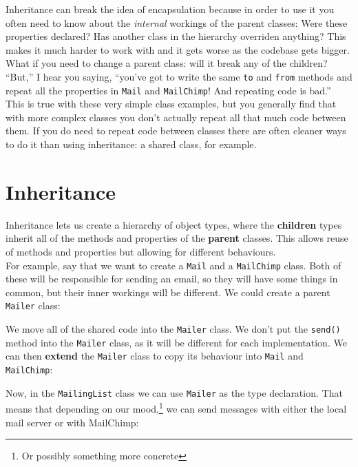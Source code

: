 Inheritance can break the idea of encapsulation because in order to use it you often need to know about the \textit{internal} workings of the parent classes: Were these properties declared? Has another class in the hierarchy overriden anything? This makes it much harder to work with and it gets worse as the codebase gets bigger. What if you need to change a parent class: will it break any of the children?
\\

``But,'' I hear you saying, ``you've got to write the same \texttt{to} and \texttt{from} methods and repeat all the properties in \texttt{Mail} and \texttt{MailChimp}! And repeating code is bad.''
\\

This is true with these very simple class examples, but you generally find that with more complex classes you don't actually repeat all that much code between them. If you do need to repeat code between classes there are often cleaner ways to do it than using inheritance: a shared class, for example.




\section{Inheritance}

Inheritance lets us create a hierarchy of object types, where the \textbf{children} types inherit all of the methods and properties of the \textbf{parent} classes. This allows reuse of methods and properties but allowing for different behaviours.
\\

For example, say that we want to create a \texttt{Mail} and a \texttt{MailChimp} class. Both of these will be responsible for sending an email, so they will have some things in common, but their inner workings will be different. We could create a parent \texttt{Mailer} class:


We move all of the shared code into the \texttt{Mailer} class. We don't put the \texttt{send()} method into the \texttt{Mailer} class, as it will be different for each implementation. We can then \textbf{extend} the \texttt{Mailer} class to copy its behaviour into \texttt{Mail} and \texttt{MailChimp}:


Now, in the \texttt{MailingList} class we can use \texttt{Mailer} as the type declaration. That means that depending on our mood,\footnote{Or possibly something more concrete} we can send messages with either the local mail server or with MailChimp:

